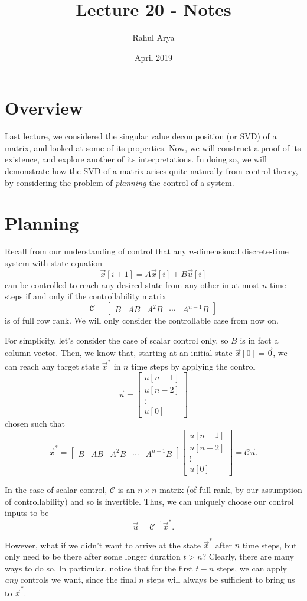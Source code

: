 \documentclass[letterpaper]{article}
\title{Lecture 20 - Notes}
\author{Rahul Arya}
\date{April 2019}
\theoremstyle{remark}
\newcommand{\mat}[1]{\ensuremath{\begin{bmatrix}#1\end{bmatrix}}}
\begin{document}
\maketitle

\section{Overview}
Last lecture, we considered the singular value decomposition (or SVD) of a matrix, and looked at some of its properties. Now, we will construct a proof of its existence, and explore another of its interpretations. In doing so, we will demonstrate how the SVD of a matrix arises quite naturally from control theory, by considering the problem of \emph{planning} the control of a system.

\section{Planning}
Recall from our understanding of control that any $n$-dimensional discrete-time system with state equation
\[
    \vec{x}[i + 1] = A\vec{x}[i] + B\vec{u}[i]
\]
can be controlled to reach any desired state from any other in at most $n$ time steps if and only if the controllability matrix
\[
    \mathscr{C} = \mat{B & AB & A^2B & \cdots & A^{n-1}B}
\]
is of full row rank. We will only consider the controllable case from now on.

For simplicity, let's consider the case of scalar control only, so $B$ is in fact a column vector. Then, we know that, starting at an initial state $\vec{x}[0] = \vec{0}$, we can reach any target state $\vec{x}^*$ in $n$ time steps by applying the control
\[
    \vec{u} = \mat{u[n - 1] \\ u[n - 2] \\ \vdots \\ u[0]}
\]
chosen such that
\[
    \vec{x}^* = \mat{B & AB & A^2B & \cdots & A^{n-1}B}\mat{u[n - 1] \\ u[n - 2] \\ \vdots \\ u[0]} = \mathscr{C}\vec{u}.
\]

In the case of scalar control, $\mathscr{C}$ is an $n\times n$ matrix (of full rank, by our assumption of controllability) and so is invertible. Thus, we can uniquely choose our control inputs to be
\[
    \vec{u} = \mathscr{C}^{-1}\vec{x}^*.
\]

However, what if we didn't want to arrive at the state $\vec{x}^*$ after $n$ time steps, but only need to be there after some longer duration $t > n$? Clearly, there are many ways to do so. In particular, notice that for the first $t - n$ steps, we can apply \emph{any} controls we want, since the final $n$ steps will always be sufficient to bring us to $\vec{x}^*$.
\end{document}
